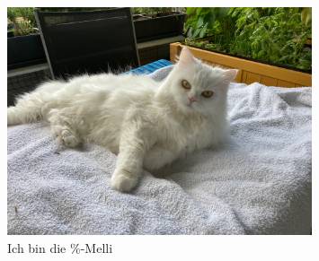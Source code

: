 \documentclass[12pt,ngerman,parskip=half]{scrreprt}
\begin{document}
\begin{figure}[bth] %
\begin{center}
\includegraphics[width=0.8\textwidth]{Bilder/Katze1}
\caption{Ich bin die \%-Melli}\label{fig:melli}
\end{center}
\end{figure}



\blindtext 

\blindtext 

\blindtext 

\blindtext 
\end{document}
